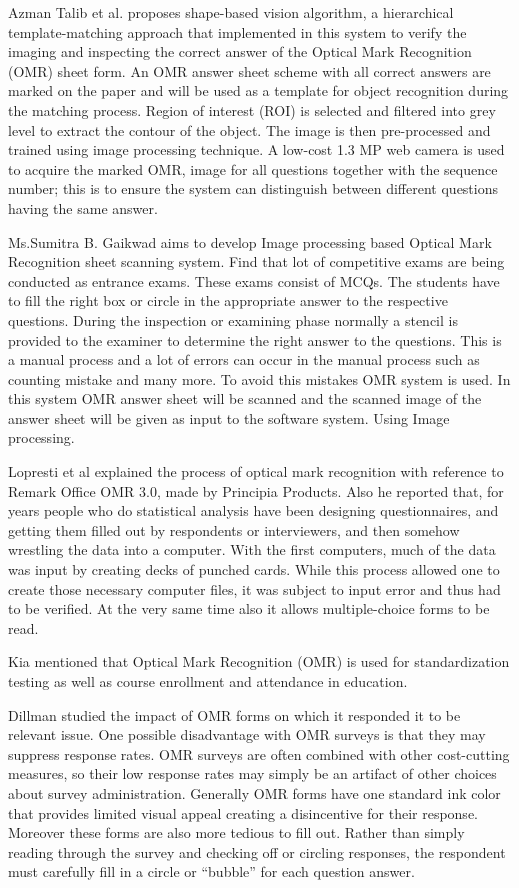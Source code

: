 \documentclass[a4paper,10pt]{article}
\begin{document}
Azman Talib et al. proposes shape-based vision algorithm, a hierarchical template-matching approach that implemented in this system to verify the imaging and inspecting the correct answer of the Optical Mark Recognition (OMR) sheet form. An OMR answer sheet scheme with all correct answers are marked on the paper and will be used as a template for object recognition during the matching process. Region of interest (ROI) is selected and filtered into grey level to extract the contour of the object. The image is then pre-processed and trained using image processing technique. A low-cost 1.3 MP web camera is used to acquire the marked OMR, image for all questions together with the sequence number; this is to ensure the system can distinguish between different questions having the same answer.

Ms.Sumitra B. Gaikwad aims to develop Image processing based Optical Mark Recognition sheet scanning system. Find that lot of competitive exams are being conducted as entrance exams. These exams consist of MCQs. The students have to fill the right box or circle in the appropriate answer to the respective questions. During the inspection or examining phase normally a stencil is provided to the examiner to determine the right answer to the questions. This is a manual process and a lot of errors can occur in the manual process such as counting mistake and many more. To avoid this mistakes OMR system is used. In this system OMR answer sheet will be scanned and the scanned image of the answer sheet will be given as input to the software system. Using Image processing.

Lopresti et al explained the process of optical mark recognition with reference to Remark Office OMR 3.0, made by Principia Products. Also he reported that, for years people who do statistical analysis have been designing questionnaires, and getting them filled out by respondents or interviewers, and then somehow wrestling the data into a computer. With the first computers, much of the data was input by creating decks of punched cards. While this process allowed one to create those necessary computer files, it was subject to input error and thus had to be verified. At the very same time also it allows multiple-choice forms to be read.

Kia mentioned that Optical Mark Recognition (OMR) is used for standardization testing as well as course enrollment and attendance in education.

Dillman studied the impact of OMR forms on which it responded it to be relevant issue. One possible disadvantage with OMR surveys is that they may suppress response rates. OMR surveys are often combined with other cost-cutting measures, so their low response rates may simply be an artifact of other choices about survey administration. Generally OMR forms have one standard ink color that provides limited visual appeal creating a disincentive for their response. Moreover these forms are also more tedious to fill out. Rather than simply reading through the survey and checking off or circling responses, the respondent must carefully fill in a circle or “bubble” for each question answer.
\end{document}
